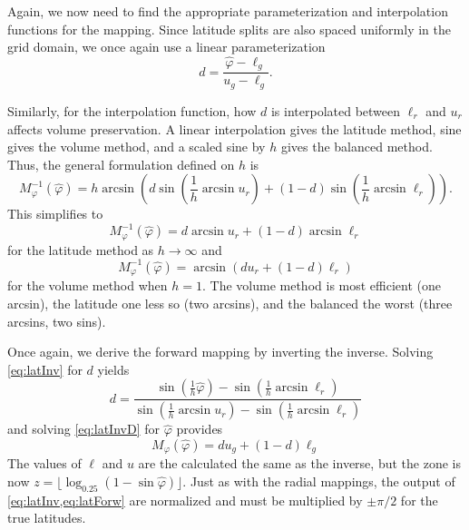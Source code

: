 Again, we now need to find the appropriate parameterization and interpolation functions for the mapping.
Since latitude splits are also spaced uniformly in the grid domain, we once again use a linear parameterization
%
\begin{equation} \label{eq:latInvD}
d = \frac{ \hat{\varphi} - \ell_g }{ u_g - \ell_g }.
\end{equation}

Similarly, for the interpolation function, how $d$ is interpolated between $\ell_r$ and $u_r$ affects volume preservation.
A linear interpolation gives the latitude method, sine gives the volume method, and a scaled sine by $h$ gives the balanced method.
Thus, the general formulation defined on $h$ is
%
\begin{equation} \label{eq:latInv}
M_\varphi^{-1}(\hat{\varphi}) = h \arcsin \left( d \sin \left( \frac{1}{h} \arcsin u_r \right) + \left( 1 - d \right) \sin \left( \frac{1}{h} \arcsin \ell_r \right) \right).
\end{equation}
%
This simplifies to
%
\begin{equation*}
M_\varphi^{-1}(\hat{\varphi}) = d \arcsin u_r  + \left( 1 - d \right) \arcsin \ell_r
\end{equation*}
%
for the latitude method as $h \rightarrow \infty$ and
%
\begin{equation*}
M_\varphi^{-1}(\hat{\varphi}) = \arcsin \left( d u_r + \left( 1 - d \right) \ell_r \right)
\end{equation*}
%
for the volume method when $h = 1$.
The volume method is most efficient (one arcsin), the latitude one less so (two arcsins), and the balanced the worst (three arcsins, two sins).


Once again, we derive the forward mapping by inverting the inverse.
Solving \cref{eq:latInv} for $d$ yields
%
\begin{equation} \label{latForwD}
d = \frac{ \sin \left( \frac{1}{h} \hat{\varphi} \right) - \sin \left( \frac{1}{h} \arcsin \ell_r \right) }{ \sin \left( \frac{1}{h} \arcsin u_r \right) - \sin \left( \frac{1}{h} \arcsin \ell_r \right) }
\end{equation}
%
and solving \cref{eq:latInvD} for $\hat{\varphi}$ provides
%
\begin{equation} \label{eq:latForw}
M_\varphi (\hat{\varphi}) = d u_g + \left( 1 - d \right) \ell_g
\end{equation}
%
The values of $\ell$ and $u$ are the calculated the same as the inverse, but the zone is now $z = \lfloor \log_{0.25} ( 1 - \sin \hat{\varphi} ) \rfloor$.
Just as with the radial mappings, the output of \cref{eq:latInv,eq:latForw} are normalized and must be multiplied by $\pm \pi / 2$ for the true latitudes.


